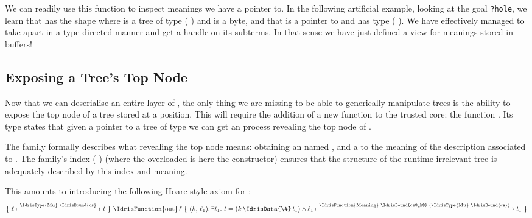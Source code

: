We can readily use this function to inspect meanings
we have a pointer to. In the following artificial example,
looking at the goal \texttt{?hole}, we learn that
 has the shape {\IdrisKeyword{(} \IdrisData{\#} \IdrisKeyword{(} \IdrisData{\#} \IdrisKeyword{))}}
where  is a tree of type ( )
and  is a byte, and that
 is a pointer to 
and  has type ( ).
We have effectively managed to take  apart in a
type-directed manner and get a handle on its subterms.
In that sense we have just defined a view for meanings stored in buffers!

\subsection{Exposing a Tree's Top Node}\label{sec:out}

Now that we can deserialise an entire layer of ,
the only thing we are missing to be able to generically manipulate trees
is the ability to expose the top node of a tree stored at a
 position.
%
This will require the addition of a new function to the trusted core:
the function .
%
Its type states that given a pointer
to a tree  of type  we can get an
 process revealing the top node of .


The  family formally describes what revealing the
top node means:
obtaining an  named ,
and a  to the meaning
 of the description associated to .
%
The family's index ( \IdrisData{\#} )
(where the overloaded \IdrisData{(\#)} is here the
 constructor)
ensures that the structure of the runtime irrelevant
tree is adequately described by this index and meaning.


This amounts to introducing the following Hoare-style axiom for
:
\[
\Hoare
    {\Pointer{\ell}{\text{\IdrisType{Mu} \IdrisBound{cs}}}{t}}
    {\text{\IdrisFunction{out}}\,\ell}
    {(k,\, \ell_1)}
    {\exists t_1.~ t = (k \,\text{\IdrisData{\#}}\, t_1)
      \wedge \Pointer{\ell_1}{\text{\IdrisFunction{Meaning} \IdrisBound{cs$_k$} (\IdrisType{Mu} \IdrisBound{cs})}}{t_1}}
\]

